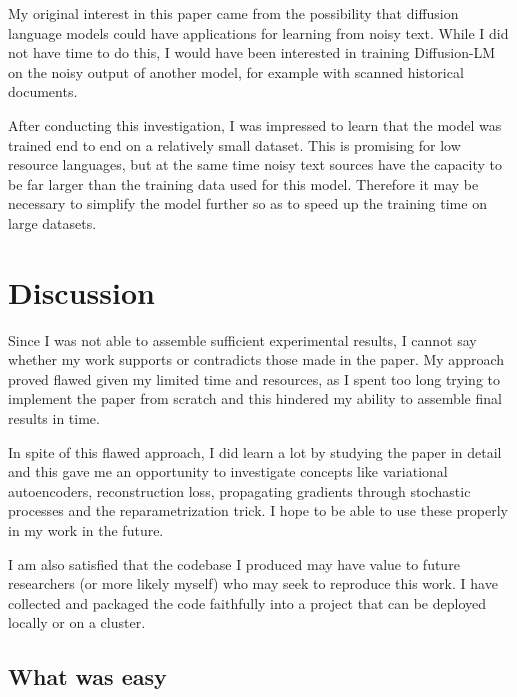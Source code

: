 My original interest in this paper came from the possibility that diffusion language models could have applications for learning from noisy text. While I did not have time to do this, I would have been interested in training Diffusion-LM on the noisy output of another model, for example with scanned historical documents.

After conducting this investigation, I was impressed to learn that the model was trained end to end on a relatively small dataset. This is promising for low resource languages, but at the same time noisy text sources have the capacity to be far larger than the training data used for this model. Therefore it may be necessary to simplify the model further so as to speed up the training time on large datasets.
 

\section{Discussion}

Since I was not able to assemble sufficient experimental results, I cannot say whether my work supports or contradicts those made in the paper. My approach proved flawed given my limited time and resources, as I spent too long trying to implement the paper from scratch and this hindered my ability to assemble final results in time.

In spite of this flawed approach, I did learn a lot by studying the paper in detail and this gave me an opportunity to investigate concepts like variational autoencoders, reconstruction loss, propagating gradients through stochastic processes and the reparametrization trick. I hope to be able to use these properly in my work in the future.

I am also satisfied that the codebase I produced may have value to future researchers (or more likely myself) who may seek to reproduce this work. I have collected and packaged the code faithfully into a project that can be deployed locally or on a cluster.

\subsection{What was easy}

